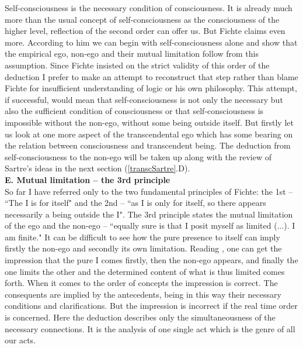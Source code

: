 Self-consciousness is the necessary condition of consciousness. It is already much more than the usual concept 
of self-consciousness as the consciousness of the higher level, reflection of the second order can offer us. But 
Fichte claims even more. According to him we can begin with self-consciousness alone and show that the 
empirical ego, non-ego and their mutual limitation follow from this assumption. Since Fichte insisted on the 
strict validity of this order of the deduction I prefer to make an attempt to reconstruct that step rather than blame 
Fichte for insufficient understanding of logic or his own philosophy. This attempt, if successful, would mean that 
self-consciousness is not only the necessary but also the sufficient condition of consciousness or that self-consciousness is impossible without  the non-ego, without some being outside itself. But firstly let us look at 
one more aspect of the transcendental ego which has some bearing on the relation between consciousness and 
transcendent being. The deduction from self-consciousness to the non-ego will be taken up along with the review 
of Sartre's ideas in the next section (\ref{transcSartre}.D). \\[1ex]
{\bf E. Mutual limitation -- the 3rd principle} \\
So far I have referred only to the two fundamental principles of Fichte: the 1st -- ``The I is for itself" and the 
2nd -- ``as I is only for itself, so there appears necessarily a being outside the I". The 3rd principle states the mutual 
limitation of the ego and the non-ego -- ``equally sure is that I posit myself as limited (...). I am finite." \cite{ITS} It can be 
difficult to see how the pure presence to itself can imply firstly the non-ego and secondly its own limitation. 
Reading \cite{ITS}, one can get the impression that the pure I comes firstly, then the non-ego appears, and finally the 
one limits the other and the determined content of what is thus limited comes forth. When it comes to the order of 
concepts the impression is correct. The consequents are implied by the antecedents, being in this way their 
necessary conditions and clarifications. But the impression is incorrect if the real time order is concerned. Here the 
deduction describes only the simultaneousness of the necessary connections. It is the analysis of one single act 
which is the genre of all our acts.

